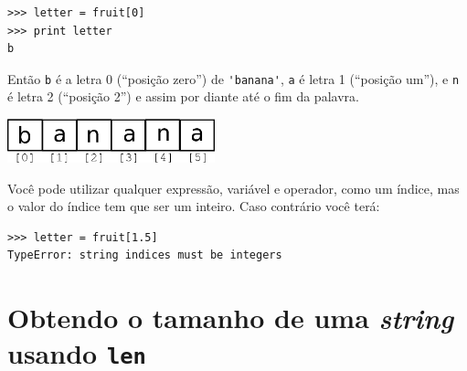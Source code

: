 \beforeverb
\begin{verbatim}
>>> letter = fruit[0]
>>> print letter
b
\end{verbatim}
\afterverb
%
%
Então {\tt b} é a letra 0 (``posição zero'') de \verb"'banana'", {\tt a} é
letra 1 (``posição um''), e {\tt n} é letra 2 (``posição 2'') e assim por
diante até o fim da palavra.

\beforefig
\centerline{\includegraphics[height=0.50in]{figs2/string.eps}}
\afterfig



Você pode utilizar qualquer expressão, variável e operador, como um índice,
mas o valor do índice tem que ser um inteiro. Caso contrário você terá:


\beforeverb
\begin{verbatim}
>>> letter = fruit[1.5]
TypeError: string indices must be integers
\end{verbatim}
\afterverb
%

\section{Obtendo o tamanho de uma {\it string} usando {\tt len}}


